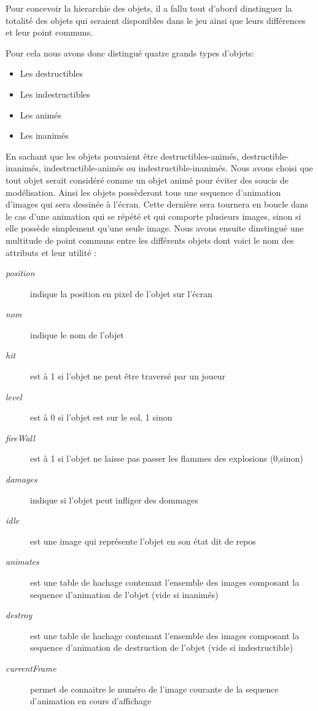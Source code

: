 		Pour concevoir la hierarchie des objets, il a fallu tout d'abord 
		dinstinguer la totalité des objets qui seraient disponibles dans 
		le jeu ainsi que leurs différences et leur point communs.
		
		Pour cela nous avons donc distingué quatre grands types d'objets:
		\begin{itemize}
		  \item Les destructibles
		  \item Les indestructibles
		  \item Les animés
		  \item Les inanimés
		\end{itemize}
		
		En sachant que les objets pouvaient être destructibles-animés, 
		destructible-inanimés, indestructible-animés ou indestructible-inanimés.
		Nous avons choisi que tout objet serait considéré comme un objet animé 
		pour éviter des soucis de modélisation.
		Ainsi les objets possèderont tous une sequence d'animation d'images qui
		 sera dessinée à l'écran.
		Cette dernière sera tournera en boucle dans le cas d'une animation 
		qui se répété et qui comporte plusieurs images, sinon si elle possède 
		simplement qu'une seule image.
		Nous avons ensuite dinstingué une multitude de point communs entre 
		les différents objets dont voici le nom des attributs et leur utilité : 
	
	\begin{description}
		\item [\textit{position}]{indique la position en pixel de l'objet sur l'écran}
		\item [\textit{nom}]{indique le nom de l'objet}
		\item [\textit{hit}]{est à 1 si l'objet ne peut être traversé par un joueur}
		\item [\textit{level}]{est à 0 si l'objet est sur le sol, 1 sinon}
		\item [\textit{fireWall}]{est à 1 si l'objet ne laisse pas passer les flammes des explosions (0,sinon)}
		\item [\textit{damages}]{indique si l'objet peut infliger des dommages}
		\item [\textit{idle}]{est une image qui représente l'objet en son état dit de repos}
		\item [\textit{animates}]{est une table de hachage contenant l'ensemble des images composant la sequence d'animation de l'objet (vide si inanimés)}
		\item [\textit{destroy}]{est une table de hachage contenant l'ensemble des images composant la sequence d'animation de destruction de l'objet (vide si indestructible)}
		\item [\textit{currentFrame}]{permet de connaitre le numéro de l'image courante de la sequence d'animation en cours d'affichage}
	\end{description}

